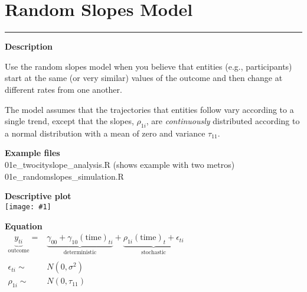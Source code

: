 \documentclass[10pt, landscape, article]{memoir}
\newcommand{\outcome}[1]{\underbrace{#1}_{\text{outcome}}}
\newcommand{\deterministic}[1]{\underbrace{#1}_{\text{deterministic}}}
\newcommand{\stochastic}[1]{\underbrace{#1}_{\text{stochastic}}}
\newenvironment{desc}{
    \begin{minipage}[t][.6\textheight][t]{.9\textwidth}
    \setlength{\parskip}{.5\baselineskip}
    \textbf{\large Description}\\\raggedright
}{
    \end{minipage}
}
\newenvironment{eqn}{
    \begin{minipage}[t][.39\textheight][t]{\textwidth}
    \textbf{\large Equation}\\
}{
    \end{minipage}
}
\newcommand{\datafig}[1]{
    \begin{minipage}[t][.6\textheight][t]{\textwidth}%
    \textbf{\large Descriptive plot}\\
    \texttt{[image: \#1]}%
    \end{minipage}
}
\newenvironment{files}{
    \begin{minipage}[t][.2\textheight][t]{\textwidth}
    \textbf{\large Example files}\\
}{
    \end{minipage}
}
\begin{document}
\chapter{Random Slopes Model}
\label{slopes}
\rule[\baselineskip]{\textwidth}{3pt}
\begin{minipage}[t][.9\textheight][t]{.4\textwidth}
\begin{desc}
Use the random slopes model when you believe that entities (e.g., participants) start at the same (or very similar) values of the outcome and then change at different rates from one another. 

The model assumes that the trajectories that entities follow vary according to a single trend, except that the slopes, $\rho_{1i}$, are \emph{continuously} distributed according to a normal distribution with a mean of zero and variance $\tau_{11}$.
\end{desc}
\begin{files}
01e\_twocityslope\_analysis.R (shows example with two metros)\\
01e\_randomslopes\_simulation.R
\end{files}
\end{minipage} %
\begin{minipage}[t][.9\textheight][t]{.6\textwidth}
\datafig{random_slopes.pdf}
\begin{eqn}
$\begin{array}{rl}
\outcome{y_{ti}} = & 
\deterministic{\gamma_{00} + \gamma_{10}(\text{time})_{ti}} + 
\stochastic{\rho_{1i}(\text{time})_{t} + \epsilon_{ti}} \\
&\\
\epsilon_{ti} \sim & N(0, \sigma^2) \\
\rho_{1i} \sim & N(0, \tau_{11})
\end{array}$
\end{eqn}
\end{minipage}
\newpage

\end{document}
